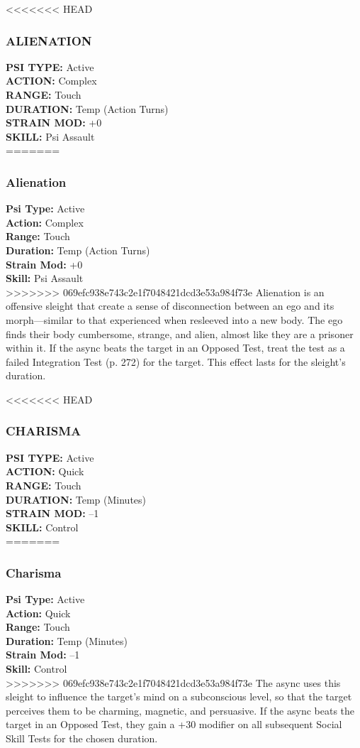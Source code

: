 <<<<<<< HEAD \subsubsection{ALIENATION} \textbf{PSI TYPE:} Active \\ \textbf{ACTION:} Complex \\ \textbf{RANGE:} Touch \\ \textbf{DURATION:} Temp (Action Turns) \\ \textbf{STRAIN MOD:} +0 \\ \textbf{SKILL:} Psi Assault \\ ======= \subsubsection{Alienation} \textbf{Psi Type:} Active \\ \textbf{Action:} Complex \\ \textbf{Range:} Touch \\ \textbf{Duration:} Temp (Action Turns) \\ \textbf{Strain Mod:} +0 \\ \textbf{Skill:} Psi Assault \\ >>>>>>> 069efc938e743c2e1f7048421dcd3e53a984f73e Alienation is an offensive sleight that create a sense of disconnection between an ego and its morph—similar to that experienced when resleeved into a new body. The ego finds their body cumbersome, strange, and alien, almost like they are a prisoner within it. If the async beats the target in an Opposed Test, treat the test as a failed Integration Test (p. 272) for the target. This effect lasts for the sleight’s duration. 

<<<<<<< HEAD \subsubsection{CHARISMA} \textbf{PSI TYPE:} Active \\ \textbf{ACTION:} Quick \\ \textbf{RANGE:} Touch \\ \textbf{DURATION:} Temp (Minutes) \\ \textbf{STRAIN MOD:} –1 \\ \textbf{SKILL:} Control\\ ======= \subsubsection{Charisma} \textbf{Psi Type:} Active \\ \textbf{Action:} Quick \\ \textbf{Range:} Touch \\ \textbf{Duration:} Temp (Minutes) \\ \textbf{Strain Mod:} –1 \\ \textbf{Skill:} Control\\ >>>>>>> 069efc938e743c2e1f7048421dcd3e53a984f73e The async uses this sleight to influence the target’s mind on a subconscious level, so that the target perceives them to be charming, magnetic, and persuasive. If the async beats the target in an Opposed Test, they gain a +30 modifier on all subsequent Social Skill Tests for the chosen duration. 

